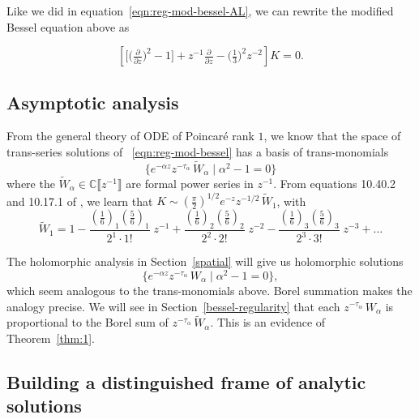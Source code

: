 \documentclass{article}
\theoremstyle{definition}
\newcommand{\C}{\mathbb{C}}
\newcommand{\series}[1]{\tilde{#1}}
\begin{document}
Like we did in equation~\ref{eqn:reg-mod-bessel-AL}, we can rewrite the modified Bessel equation above as 

\begin{equation}\label{eqn:reg-mod-bessel}
\left[ \big[ \big(\tfrac{\partial}{\partial z}\big)^2 - 1 \big] + z^{-1} \tfrac{\partial}{\partial z} - \big(\tfrac{1}{3}\big)^2 z^{-2} \right] K = 0.
\end{equation}

\subsection{Asymptotic analysis}
From the general theory of ODE of Poincar\'e rank $1$, we know that the space of trans-series solutions of ~\eqref{eqn:reg-mod-bessel} has a basis of trans-monomials
\[ \{ e^{-\alpha z} z^{-\tau_\alpha}\,\series{W}_\alpha \mid \alpha^2 - 1 = 0 \} \]
where the $\series{W}_\alpha\in\C\llbracket z^{-1} \rrbracket$ are formal power series in $z^{-1}$. From equations 10.40.2 and 10.17.1 of \cite{dlmf}, we learn that $K \sim \left(\tfrac{\pi}{2}\right)^{1/2} e^{-z} z^{-1/2}\,\series{W}_1$, with
\begin{equation}\label{bessel-asymp}
\series{W}_1 = 1 - \frac{(\tfrac{1}{6})_1 (\tfrac{5}{6})_1}{2^1 \cdot 1!}\;z^{-1} + \frac{(\tfrac{1}{6})_2 (\tfrac{5}{6})_2}{2^2 \cdot 2!}\;z^{-2} - \frac{(\tfrac{1}{6})_3 (\tfrac{5}{6})_3}{2^3 \cdot 3!}\;z^{-3} + \ldots
\end{equation}

The holomorphic analysis in Section~\ref{spatial} will give us holomorphic solutions
\[ \{ e^{-\alpha z} z^{-\tau_\alpha}\,W_\alpha \mid \alpha^2 - 1 = 0 \}, \]
which seem analogous to the trans-monomials above. Borel summation makes the analogy precise. We will see in Section~\ref{bessel-regularity} that each $z^{-\tau_\alpha}\,W_\alpha$ is proportional to the Borel sum of $z^{-\tau_\alpha}\,\series{W}_\alpha$. This is an evidence of Theorem~\ref{thm:1}.

\subsection{Building a distinguished frame of analytic solutions}
\end{document}
